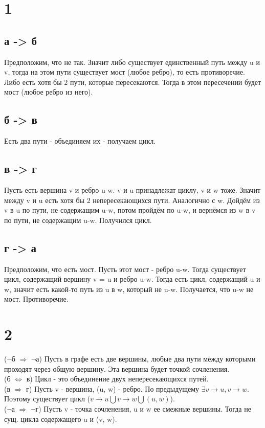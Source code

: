 \documentclass[12pt]{extarticle}
\begin{document}
\section*{1}
\subsection*{а -> б}
Предположим, что не так. Значит либо существует единственный путь между u и v, тогда на этом пути существует мост (любое ребро), то есть противоречие. Либо есть хотя бы 2 пути, которые пересекаются. Тогда в этом пересечении будет мост (любое ребро из него).
\subsection*{б -> в}
Есть два пути - объединяем их - получаем цикл.
\subsection*{в -> г}
Пусть есть вершина v и ребро u-w. v и u принадлежат циклу, v и w тоже. Значит между v и u есть хотя бы 2 непересекающихся пути. Аналогично с w. Дойдём из v в u по пути, не содержащим u-w, потом пройдём по u-w, и вернёмся из w в v по пути, не содержащим u-w. Получился цикл.
\subsection*{г -> а}
Предположим, что есть мост. Пусть этот мост - ребро u-w. Тогда существует цикл, содержащий вершину v = u и ребро u-w. Тогда есть цикл, содержащий u и w, значит есть какой-то путь из u в w, который не u-w. Получается, что u-w не мост. Противоречие.

\section*{2}
($\neg$б $\Rightarrow$ $\neg$а) Пусть в графе есть две вершины, любые два пути между которыми проходят через общую вершину. Эта вершина будет точкой сочленения. \\
(б $\Leftrightarrow$ в) Цикл - это объединение двух непересекающихся путей.\\
(в $\Rightarrow$ г) Пусть v - вершина, (u, w) - ребро. По предыдущему $\exists v \rightarrow u, v \rightarrow w$. Поэтому существует цикл ($v \rightarrow u \bigcup v \rightarrow w \bigcup (u, w)$).\\
($\neg$а $\Rightarrow$ $\neg$г) Пусть v - точка сочленения, u и w ее смежные вершины. Тогда не сущ. цикла содержащего u и (v, w).
\end{document}

